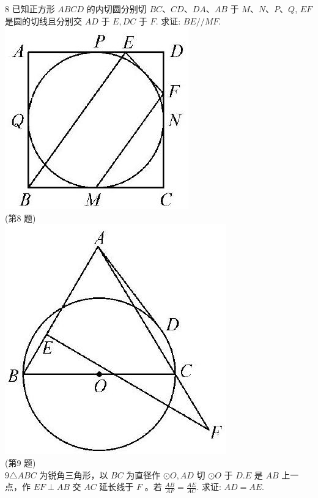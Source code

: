 \documentclass[10pt]{article}
\begin{document}
8 已知正方形 $A B C D$ 的内切圆分别切 $B C 、 C D 、 D A 、 A B$ 于 $M 、 N 、 P 、 Q$, $E F$ 是圆的切线且分别交 $A D$ 于 $E, D C$ 于 $F$. 求证: $B E / / M F$.\\
\includegraphics[max width=\textwidth, center]{2024_10_30_66b8e5e701da2093c133g-042(2)}\\
(第8 题)\\
\includegraphics[max width=\textwidth, center]{2024_10_30_66b8e5e701da2093c133g-042(1)}\\
(第9 题)\\
$9 \triangle A B C$ 为锐角三角形，以 $B C$ 为直径作 $\odot O, A D$ 切 $\odot O$ 于 $D . E$ 是 $A B$ 上一点，作 $E F \perp A B$ 交 $A C$ 延长线于 $F$ 。若 $\frac{A B}{A F}=\frac{A E}{A C}$. 求证: $A D=A E$.
\end{document}

